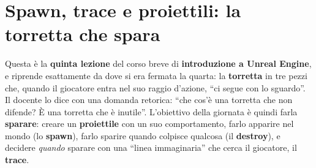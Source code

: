%
%
%    
%

\chapter[Spawn, trace e proiettili]{Spawn, trace e proiettili: la torretta che spara}
\label{ue5:cap:spawn}

Questa è la \textbf{quinta lezione} del corso breve di \textbf{introduzione a Unreal
Engine}, e riprende esattamente da dove si era fermata la quarta: la
\textbf{torretta} in tre pezzi che, quando il giocatore entra nel suo raggio
d'azione, ``ci segue con lo sguardo''. Il docente lo dice con una domanda retorica:
``che cos'è una torretta che non difende? È una torretta che è inutile''. L'obiettivo
della giornata è quindi farla \textbf{sparare}: creare un \textbf{proiettile} con un
suo comportamento, farlo apparire nel mondo (lo \textbf{spawn}), farlo sparire quando
colpisce qualcosa (il \textbf{destroy}), e decidere \emph{quando} sparare con una
``linea immaginaria'' che cerca il giocatore, il \textbf{trace}.

